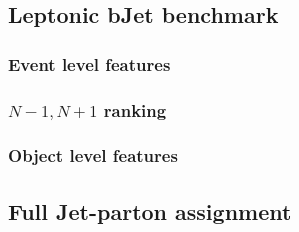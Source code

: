 \subsection{Leptonic bJet benchmark}

\subsubsection*{Event level features}
\subsubsection*{{$N-1,N+1$} ranking}
\subsubsection*{Object level features}
\subsection{Full Jet-parton assignment}

